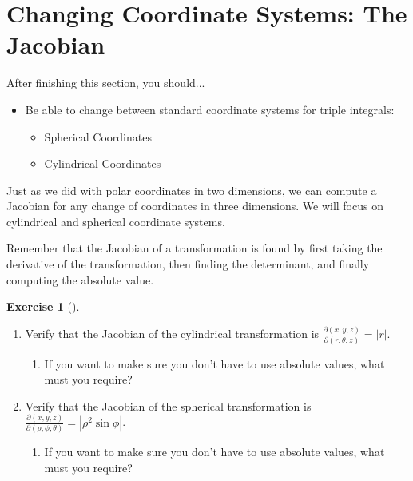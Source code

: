 \documentclass[10pt,]{book}
\theoremstyle{plain}
\theoremstyle{definition}
\theoremstyle{definition}
\theoremstyle{definition}
\theoremstyle{definition}
\newtheorem{exploration}[project]{Exercise}
\theoremstyle{definition}
\numberwithin{equation}{section}
\newcommand{\ds}{\displaystyle}
\begin{document}
\section[{Changing Coordinate Systems: The Jacobian}]{Changing Coordinate Systems: The Jacobian}\label{section-46}
After finishing this section, you should...%
\leavevmode%
\begin{itemize}[label=\textbullet]
\item{}Be able to change between standard coordinate systems for triple integrals:%
%
\begin{itemize}[label=$\circ$]
\item{}Spherical Coordinates%
\item{}Cylindrical Coordinates%
\end{itemize}
\end{itemize}
Just as we did with polar coordinates in two dimensions, we can compute a Jacobian for any change of coordinates in three dimensions. We will focus on cylindrical and spherical coordinate systems.%
\par
Remember that the Jacobian of a transformation is found by first taking the derivative of the transformation, then finding the determinant, and finally computing the absolute value.%
\begin{exploration}[]\label{exploration-301}
\leavevmode%
\begin{enumerate}[font=\bfseries,label=(\alph*),ref=\alph*]
\item\label{task-829} Verify that the Jacobian of the cylindrical transformation is \(\ds\frac{\partial(x,y,z)}{\partial(r,\theta,z)} = |r|\). \leavevmode%
\begin{itemize}[label=\textbullet]
\begin{enumerate}[font=\bfseries,label=(\alph*),ref=\alph*]
\item\label{task-830} If you want to make sure you don't have to use absolute values, what must you require?%
\end{enumerate}
\end{itemize}
%
\item\label{task-831} Verify that the Jacobian of the spherical transformation is \(\ds\frac{\partial(x,y,z)}{\partial(\rho,\phi,\theta)} = |\rho^2\sin\phi|\). \leavevmode%
\begin{itemize}[label=\textbullet]
\begin{enumerate}[font=\bfseries,label=(\alph*),ref=\alph*]
\item\label{task-832} If you want to make sure you don't have to use absolute values, what must you require?%
\end{enumerate}
\end{itemize}
%
\end{enumerate}
\end{exploration}
\end{document}
